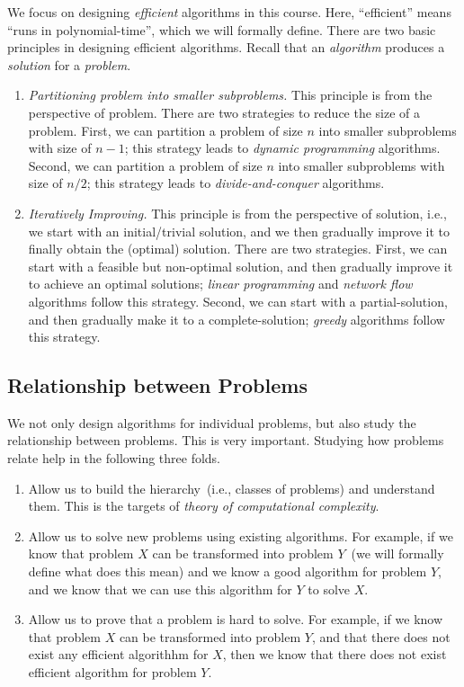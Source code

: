 We focus on designing \emph{efficient} algorithms in this course. Here, ``efficient'' means ``runs in polynomial-time'', which we will formally define.
There are two basic principles in designing efficient algorithms.
Recall that an \emph{algorithm} produces a \emph{solution} for a \emph{problem}.
\vspace*{-\topsep}
\begin{enumerate}
\item \emph{Partitioning problem into smaller subproblems.} This principle is from the perspective of problem.
There are two strategies to reduce the size of a problem. 
First, we can partition a problem of size $n$ into smaller subproblems with size of $n - 1$; this strategy leads to \emph{dynamic programming} algorithms.
Second, we can partition a problem of size $n$ into smaller subproblems with size of $n/2$; this strategy leads to \emph{divide-and-conquer} algorithms.
\item \emph{Iteratively Improving.} This principle is from the perspective of solution, i.e., we start with an initial/trivial solution,
and we then gradually improve it to finally obtain the (optimal) solution.
There are two strategies. First, we can start with a feasible but non-optimal solution, and then gradually improve it to achieve an optimal solutions;
\emph{linear programming} and \emph{network flow} algorithms follow this strategy.
Second, we can start with a partial-solution, and then gradually make it to a complete-solution;
\emph{greedy } algorithms follow this strategy.
\end{enumerate}

\subsection*{Relationship between Problems}

We not only design algorithms for individual problems, but also study the relationship between problems.
This is very important. Studying how problems relate help in the following three folds.
\vspace*{-\topsep}
\begin{enumerate}
\item Allow us to build the hierarchy~(i.e., classes of problems) and understand them. This is the targets of \emph{theory of computational complexity}.
\item Allow us to solve new problems using existing algorithms. For example, if we know that problem $X$ can be transformed into problem $Y$~(we will formally define what does this mean)
	and we know a good algorithm for problem $Y$, and we know that we can use this algorithm for $Y$ to solve $X$.
\item Allow us to prove that a problem is hard to solve. For example, if we know that problem $X$ can be transformed into problem $Y$, and that there does not exist
any efficient algorithhm for $X$, then we know that there does not exist efficient algorithm for problem $Y$.
\end{enumerate}


